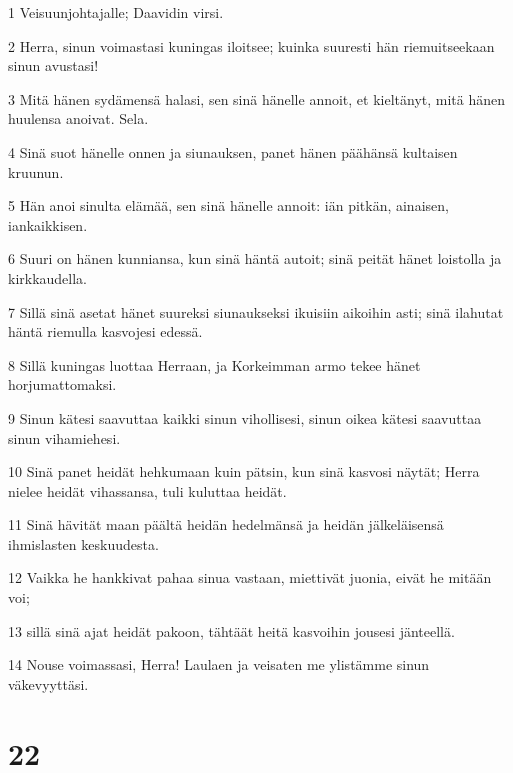 \par 1 Veisuunjohtajalle; Daavidin virsi.
\par 2 Herra, sinun voimastasi kuningas iloitsee; kuinka suuresti hän riemuitseekaan sinun avustasi!
\par 3 Mitä hänen sydämensä halasi, sen sinä hänelle annoit, et kieltänyt, mitä hänen huulensa anoivat. Sela.
\par 4 Sinä suot hänelle onnen ja siunauksen, panet hänen päähänsä kultaisen kruunun.
\par 5 Hän anoi sinulta elämää, sen sinä hänelle annoit: iän pitkän, ainaisen, iankaikkisen.
\par 6 Suuri on hänen kunniansa, kun sinä häntä autoit; sinä peität hänet loistolla ja kirkkaudella.
\par 7 Sillä sinä asetat hänet suureksi siunaukseksi ikuisiin aikoihin asti; sinä ilahutat häntä riemulla kasvojesi edessä.
\par 8 Sillä kuningas luottaa Herraan, ja Korkeimman armo tekee hänet horjumattomaksi.
\par 9 Sinun kätesi saavuttaa kaikki sinun vihollisesi, sinun oikea kätesi saavuttaa sinun vihamiehesi.
\par 10 Sinä panet heidät hehkumaan kuin pätsin, kun sinä kasvosi näytät; Herra nielee heidät vihassansa, tuli kuluttaa heidät.
\par 11 Sinä hävität maan päältä heidän hedelmänsä ja heidän jälkeläisensä ihmislasten keskuudesta.
\par 12 Vaikka he hankkivat pahaa sinua vastaan, miettivät juonia, eivät he mitään voi;
\par 13 sillä sinä ajat heidät pakoon, tähtäät heitä kasvoihin jousesi jänteellä.
\par 14 Nouse voimassasi, Herra! Laulaen ja veisaten me ylistämme sinun väkevyyttäsi.

\chapter{22}

